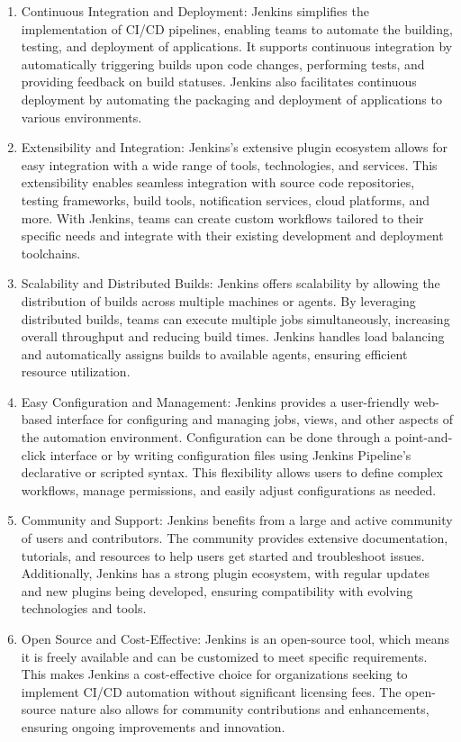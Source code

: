 \begin{enumerate}
    \item Continuous Integration and Deployment: Jenkins simplifies the implementation of CI/CD pipelines, enabling teams to automate the building, testing, and deployment of applications. It supports continuous integration by automatically triggering builds upon code changes, performing tests, and providing feedback on build statuses. Jenkins also facilitates continuous deployment by automating the packaging and deployment of applications to various environments.

    \item Extensibility and Integration: Jenkins's extensive plugin ecosystem allows for easy integration with a wide range of tools, technologies, and services. This extensibility enables seamless integration with source code repositories, testing frameworks, build tools, notification services, cloud platforms, and more. With Jenkins, teams can create custom workflows tailored to their specific needs and integrate with their existing development and deployment toolchains.

    \item Scalability and Distributed Builds: Jenkins offers scalability by allowing the distribution of builds across multiple machines or agents. By leveraging distributed builds, teams can execute multiple jobs simultaneously, increasing overall throughput and reducing build times. Jenkins handles load balancing and automatically assigns builds to available agents, ensuring efficient resource utilization.

    \item Easy Configuration and Management: Jenkins provides a user-friendly web-based interface for configuring and managing jobs, views, and other aspects of the automation environment. Configuration can be done through a point-and-click interface or by writing configuration files using Jenkins Pipeline's declarative or scripted syntax. This flexibility allows users to define complex workflows, manage permissions, and easily adjust configurations as needed.

    \item Community and Support: Jenkins benefits from a large and active community of users and contributors. The community provides extensive documentation, tutorials, and resources to help users get started and troubleshoot issues. Additionally, Jenkins has a strong plugin ecosystem, with regular updates and new plugins being developed, ensuring compatibility with evolving technologies and tools.

    \item Open Source and Cost-Effective: Jenkins is an open-source tool, which means it is freely available and can be customized to meet specific requirements. This makes Jenkins a cost-effective choice for organizations seeking to implement CI/CD automation without significant licensing fees. The open-source nature also allows for community contributions and enhancements, ensuring ongoing improvements and innovation.
\end{enumerate}